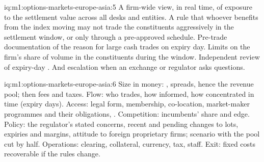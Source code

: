 \begin{solution}{iq:m1:options-markets-europe-asia:5}
A firm-wide view, in real time, of exposure to the settlement value across
all desks and entities. A rule that whoever benefits from the index moving
may not trade the constituents aggressively in the settlement window, or
only through a pre-approved schedule. Pre-trade documentation of the reason
for large cash trades on expiry day. Limits on the firm's share of volume in
the constituents during the window. Independent review of expiry-day . And escalation when an exchange or regulator asks questions.
\end{solution}

\begin{solution}{iq:m1:options-markets-europe-asia:6}
Size in money: , spreads, hence the revenue pool; then fees
and taxes. Flow: who trades, how informed, how concentrated in time
(expiry days). Access: legal form, membership, co-location, market-maker
programmes and their obligations, . Competition: incumbents'
share and edge. Policy: the regulator's stated concerns, recent and pending
changes to lots, expiries and margins, attitude to foreign proprietary
firms; scenario with the pool cut by half. Operations: clearing, collateral,
currency, tax, staff. Exit: fixed costs recoverable if the rules change.
\end{solution}

